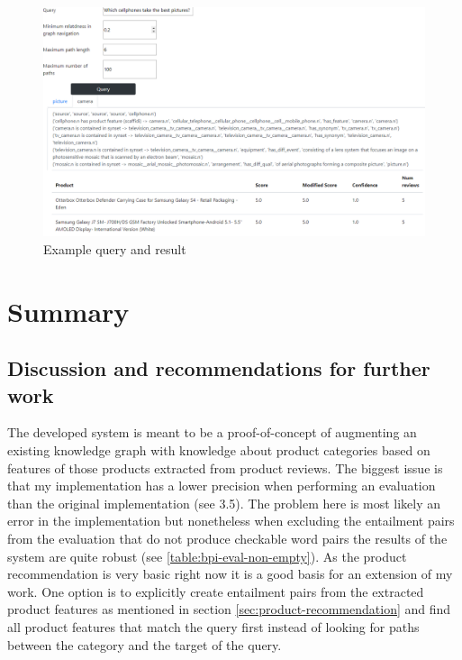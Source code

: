 \begin{figure}[H]
    \centering
    \includegraphics[scale=0.5]{fig/query-example.PNG}
    \caption{Example query and result}
    \label{fig:query-example}
\end{figure}


\chapter{Summary}

\section{Discussion and recommendations for further work}
The developed system is meant to be a proof-of-concept of augmenting an existing knowledge
graph with knowledge about product categories based on features of those products extracted
from product reviews. The biggest issue is that my implementation has a lower precision when
performing an evaluation than the original implementation (see 3.5). The problem here is most
likely an error in the implementation but nonetheless when excluding the entailment pairs from
the evaluation that do not produce checkable word pairs the results of the system are quite
robust (see \ref{table:bpi-eval-non-empty}).
As the product recommendation is very basic right now it is a good basis for an extension of my
work. One option is to explicitly create entailment pairs from the extracted product
features as mentioned in section \ref{sec:product-recommendation} and find all product features that match the query first
instead of looking for paths between the category and the target of the query.


